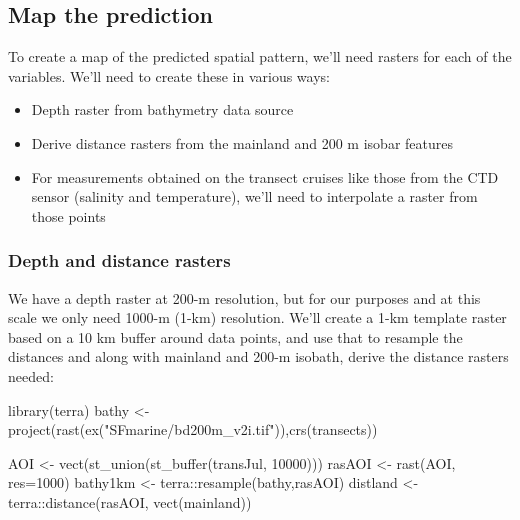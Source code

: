\documentclass[
]{book}
\newenvironment{Shaded}{\begin{snugshade}}{\end{snugshade}}
\newcommand{\AttributeTok}[1]{\textcolor[rgb]{0.61,0.61,0.61}{#1}}
\newcommand{\DecValTok}[1]{\textcolor[rgb]{0.06,0.06,0.06}{#1}}
\newcommand{\FunctionTok}[1]{\textcolor[rgb]{0,0,0}{#1}}
\newcommand{\NormalTok}[1]{#1}
\newcommand{\OtherTok}[1]{\textcolor[rgb]{0.37,0.37,0.37}{#1}}
\newcommand{\SpecialCharTok}[1]{\textcolor[rgb]{0,0,0}{#1}}
\newcommand{\StringTok}[1]{\textcolor[rgb]{0.5,0.5,0.5}{#1}}
\providecommand{\tightlist}{%
  \setlength{\itemsep}{0pt}\setlength{\parskip}{0pt}}
\begin{document}
\hypertarget{map-the-prediction}{%
\subsection{Map the prediction}\label{map-the-prediction}}

To create a map of the predicted spatial pattern, we'll need rasters for each of the variables. We'll need to create these in various ways:

\begin{itemize}
\tightlist
\item
  Depth raster from bathymetry data source
\item
  Derive distance rasters from the mainland and 200 m isobar features
\item
  For measurements obtained on the transect cruises like those from the CTD sensor (salinity and temperature), we'll need to interpolate a raster from those points
\end{itemize}

\hypertarget{depth-and-distance-rasters}{%
\subsubsection{Depth and distance rasters}\label{depth-and-distance-rasters}}

We have a depth raster at 200-m resolution, but for our purposes and at this scale we only need 1000-m (1-km) resolution. We'll create a 1-km template raster based on a 10 km buffer around data points, and use that to resample the distances and along with mainland and 200-m isobath, derive the distance rasters needed:

\begin{Shaded}
\begin{Highlighting}[]
\FunctionTok{library}\NormalTok{(terra)}
\NormalTok{bathy }\OtherTok{\textless{}{-}} \FunctionTok{project}\NormalTok{(}\FunctionTok{rast}\NormalTok{(}\FunctionTok{ex}\NormalTok{(}\StringTok{"SFmarine/bd200m\_v2i.tif"}\NormalTok{)),}\FunctionTok{crs}\NormalTok{(transects))}
\end{Highlighting}
\end{Shaded}

\begin{Shaded}
\begin{Highlighting}[]
\NormalTok{AOI }\OtherTok{\textless{}{-}} \FunctionTok{vect}\NormalTok{(}\FunctionTok{st\_union}\NormalTok{(}\FunctionTok{st\_buffer}\NormalTok{(transJul, }\DecValTok{10000}\NormalTok{)))}
\NormalTok{rasAOI }\OtherTok{\textless{}{-}} \FunctionTok{rast}\NormalTok{(AOI, }\AttributeTok{res=}\DecValTok{1000}\NormalTok{)}
\NormalTok{bathy1km }\OtherTok{\textless{}{-}}\NormalTok{ terra}\SpecialCharTok{::}\FunctionTok{resample}\NormalTok{(bathy,rasAOI)}
\NormalTok{distland }\OtherTok{\textless{}{-}}\NormalTok{ terra}\SpecialCharTok{::}\FunctionTok{distance}\NormalTok{(rasAOI, }\FunctionTok{vect}\NormalTok{(mainland))}
\end{Highlighting}
\end{Shaded}
\end{document}
